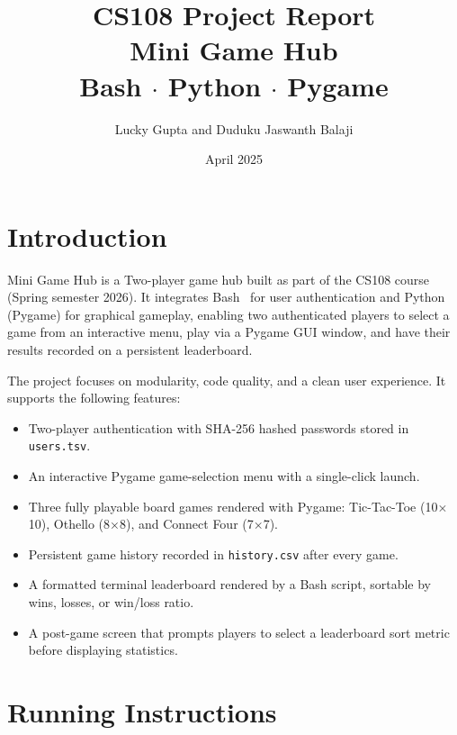 \documentclass[12pt, letterpaper]{article}
\title{
    \vspace{-1cm}
    {\Large CS108 Project Report} \\[0.4em]
    {\huge \textbf{Mini Game Hub}} \\[0.4em]
    {\large Bash $\cdot$ Python $\cdot$ Pygame}
}
\author{Lucky Gupta and Duduku Jaswanth Balaji}
\date{April 2025}
\begin{document}
\maketitle
\thispagestyle{fancy}
\tableofcontents
\newpage

\section{Introduction}

Mini Game Hub is a Two-player game hub built as part of the CS108 course
(Spring semester 2026). It integrates Bash~\cite{bash_doc} for user authentication and
Python (Pygame) for graphical gameplay, enabling two authenticated players to
select a game from an interactive menu, play via a Pygame GUI window, and have
their results recorded on a persistent leaderboard.

The project focuses on modularity, code quality, and a clean user experience.
It supports the following features:

\begin{itemize}
    \item Two-player authentication with SHA-256 hashed passwords stored in
          \texttt{users.tsv}.
    \item An interactive Pygame game-selection menu with a single-click launch.
    \item Three fully playable board games rendered with Pygame:
          Tic-Tac-Toe (10$\times$10), Othello (8$\times$8), and Connect Four
          (7$\times$7).
    \item Persistent game history recorded in \texttt{history.csv} after every
          game.
    \item A formatted terminal leaderboard rendered by a Bash script, sortable
          by wins, losses, or win/loss ratio.
    \item A post-game screen that prompts players to select a leaderboard sort
          metric before displaying statistics.
\end{itemize}

\section{Running Instructions}
\end{document}
